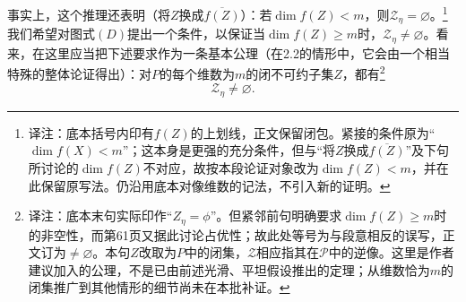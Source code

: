 \documentclass[openany,fontset=fandol]{ctexbook}
\newcommand{\note}[1]{\unskip\nobreak\footnote{译注：#1}}
\begin{document}
\newpage
事实上，这个推理还表明（将$Z$换成$\overline{f(Z)}$）：若$\dim f(Z)<m$，则$\mathcal Z_\eta=\varnothing$。\note{底本括号内印有$f(Z)$的上划线，正文保留闭包。紧接的条件原为“$\dim f(X)<m$”；这本身是更强的充分条件，但与“将$Z$换成$\overline{f(Z)}$”及下句所讨论的$\dim f(Z)$不对应，故按本段论证对象改为$\dim f(Z)<m$，并在此保留原写法。仍沿用底本对像维数的记法，不引入新的证明。}
我们希望对图式$(D)$提出一个条件，以保证当$\dim f(Z)\geq m$时，$\mathcal Z_\eta\ne\varnothing$。看来，在这里应当把下述要求作为一条基本公理（在2.2的情形中，它会由一个相当特殊的整体论证得出）：对$P$的每个维数为$m$的闭不可约子集$Z$，都有\note{底本末句实际印作“$Z_\eta=\phi$”。但紧邻前句明确要求$\dim f(Z)\geq m$时的非空性，而第61页又据此讨论占优性；故此处等号为与段意相反的误写，正文订为$\ne\varnothing$。本句$Z$改取为$P$中的闭集，$\mathcal Z$相应指其在$\mathcal P$中的逆像。这里是作者建议加入的公理，不是已由前述光滑、平坦假设推出的定理；从维数恰为$m$的闭集推广到其他情形的细节尚未在本批补证。}
\[
\mathcal Z_\eta\ne\varnothing.
\]
\end{document}

